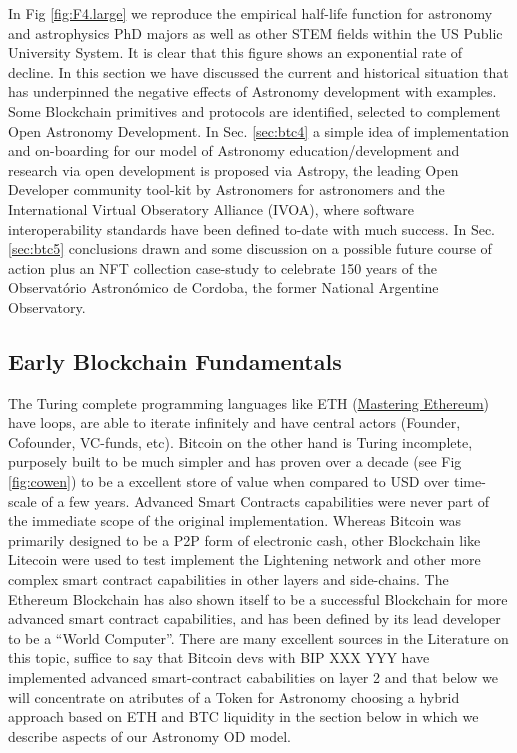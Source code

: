 \documentclass[final,5p,times,twocolumn,authoryear]{elsarticle}
\begin{document}
In Fig \ref{fig:F4.large} we reproduce the empirical half-life function for astronomy and astrophysics PhD majors as well as other STEM fields within the US Public University System. It is clear that this figure shows an exponential rate of decline.  In this section we have discussed the current and historical situation that has underpinned the negative effects of Astronomy development with examples. Some Blockchain primitives and protocols are identified, selected to complement Open Astronomy Development.  In Sec. \ref{sec:btc4} a simple idea of implementation and on-boarding for our model of Astronomy education/development and research via open development is proposed via Astropy, the leading Open Developer community tool-kit by Astronomers for astronomers and the International Virtual Obseratory Alliance (IVOA), where software interoperability standards have been defined to-date with much success. In Sec. \ref{sec:btc5} conclusions drawn and some discussion on a possible future course of action plus an NFT collection case-study to celebrate 150 years of the Observat\'orio Astron\'omico de Cordoba, the former National Argentine Observatory. 

\subsection{Early Blockchain Fundamentals}
\label{subsec:fundamentals}

The Turing complete programming languages like ETH (\href{https://github.com/ethereumbook/ethereumbook#readme}{Mastering Ethereum}) have loops, are able to iterate infinitely and have central actors (Founder, Cofounder, VC-funds, etc). Bitcoin on the other hand is Turing incomplete, purposely built to be much simpler and has proven over a decade (see Fig \ref{fig:cowen}) to be a excellent store of value when compared to USD over time-scale of a few years. Advanced Smart Contracts capabilities were never part of the immediate scope of the original implementation. Whereas Bitcoin was primarily designed to be a P2P form of electronic cash, other Blockchain like Litecoin were used to test implement the Lightening network and other more complex smart contract capabilities in other layers and side-chains. The Ethereum Blockchain has also shown itself to be a successful Blockchain for more advanced smart contract capabilities, and has been defined by its lead developer to be a “World Computer”. There are many excellent sources in the Literature on this topic, suffice to say that Bitcoin devs with BIP XXX YYY have implemented advanced smart-contract cababilities on layer 2 and that below we will concentrate on atributes of a Token for Astronomy choosing a hybrid approach based on ETH and BTC liquidity in the section below in which we describe aspects of our Astronomy OD model.
 
\end{document}

